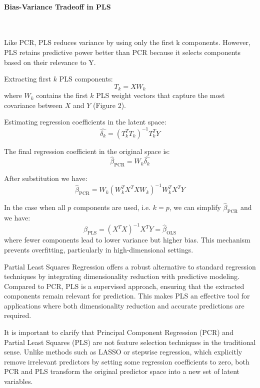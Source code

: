 \documentclass[11pt,twoside,a4paper]{article}
\begin{document}
\paragraph {Bias-Variance Tradeoff in PLS} \ \

Like PCR, PLS reduces variance by using only the first k components. However, PLS retains predictive power better than PCR because it selects components based on their relevance to Y. 

Extracting first \( k \) PLS components:
\begin{equation}
T_k = XW_k
\end{equation}
where \(W_k \) contains the first \( k \) PLS weight vectors that capture the most covariance between \( X \) and \( Y \) (Figure 2).

Estimating regression coefficients in the latent space:
 \begin{equation}
\hat{\delta_k} = (T_k^T T_k)^{-1} T_k^T Y
\end{equation}

The final regression coefficient in the original space is:
\begin{equation}
\hat{\beta}_{\text{PCR}} = W_k \hat{\delta_k} 
\end{equation}

After substitution we have:
\begin{equation}
\hat{\beta}_{\text{PCR}} = W_k (W_k^T X^T X W_k)^{-1} W_k^T X^T Y
\end{equation}

In the case when all \(p \) components are used, i.e. \(k = p \), we can simplify \(\hat{\beta}_{\text{PCR}} \) and we have:
\begin{equation}
\hat{\beta}_{\text{PLS}} = (X^T X)^{-1} X^T Y = \hat{\beta}_{\text{OLS}} 
\end{equation}
where fewer components lead to lower variance but higher bias. This mechanism prevents overfitting, particularly in high-dimensional settings.

Partial Least Squares Regression offers a robust alternative to standard regression techniques by integrating dimensionality reduction with predictive modeling. Compared to PCR, PLS is a supervised approach, ensuring that the extracted components remain relevant for prediction. This makes PLS an effective tool for applications where both dimensionality reduction and accurate predictions are required.

It is important to clarify that Principal Component Regression (PCR) and Partial Least Squares (PLS) are not feature selection techniques in the traditional sense. Unlike methods such as LASSO or stepwise regression, which explicitly remove irrelevant predictors by setting some regression coefficients to zero, both PCR and PLS transform the original predictor space into a new set of latent variables.
\end{document}
